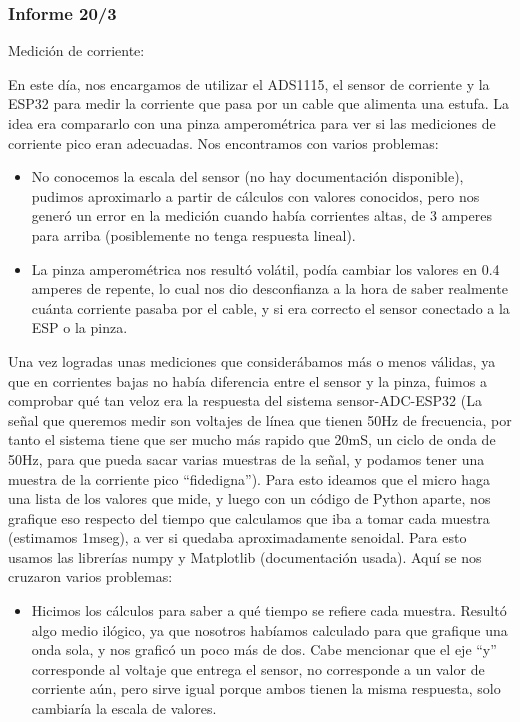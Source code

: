 \subsubsection{Informe 20/3}

Medición de corriente:

En este día, nos encargamos de utilizar el ADS1115, el sensor de corriente y la ESP32 para medir la corriente que pasa por un cable que alimenta una estufa. La idea era compararlo con una pinza amperométrica para ver si las mediciones de corriente pico eran adecuadas. Nos encontramos con varios problemas:
\begin{itemize}
\item No conocemos la escala del sensor (no hay documentación disponible), pudimos aproximarlo a partir de cálculos con valores conocidos, pero nos generó un error en la medición cuando había corrientes altas, de 3 amperes para arriba (posiblemente no tenga respuesta lineal).
\item La pinza amperométrica nos resultó volátil, podía cambiar los valores en 0.4 amperes de repente, lo cual nos dio desconfianza a la hora de saber realmente cuánta corriente pasaba por el cable, y si era correcto el sensor conectado a la ESP o la pinza.\\
\end{itemize}

Una vez logradas unas mediciones que considerábamos más o menos válidas, ya que en corrientes bajas no había diferencia entre el sensor y la pinza, fuimos a comprobar qué tan veloz era la respuesta del sistema sensor-ADC-ESP32 (La señal que queremos medir son voltajes de línea que tienen 50Hz de frecuencia, por tanto el sistema tiene que ser mucho más rapido que 20mS, un ciclo de onda de 50Hz, para que pueda sacar varias muestras de la señal, y podamos tener una muestra de la corriente pico “fidedigna”). Para esto ideamos que el micro haga una lista de los valores que mide, y luego con un código de Python aparte, nos grafique eso respecto del tiempo que calculamos que iba a tomar cada muestra (estimamos 1mseg), a ver si quedaba aproximadamente senoidal. Para esto usamos las librerías numpy y Matplotlib (documentación usada). Aquí se nos cruzaron varios problemas:
\begin{itemize}
\item Hicimos los cálculos para saber a qué tiempo se refiere cada muestra. Resultó algo medio ilógico, ya que nosotros habíamos calculado para que grafique una onda sola, y nos graficó un poco más de dos. Cabe mencionar que el eje “y” corresponde al voltaje que entrega el sensor, no corresponde a un valor de corriente aún, pero sirve igual porque ambos tienen la misma respuesta, solo cambiaría la escala de valores.\\
\end{itemize}

